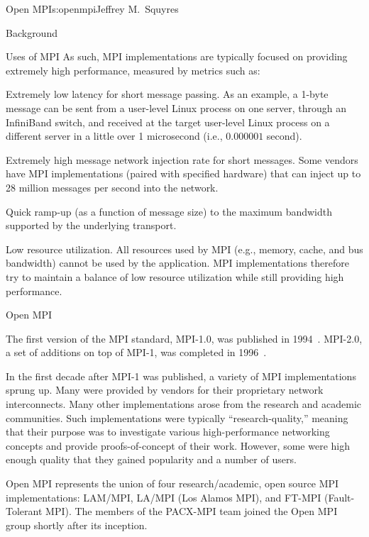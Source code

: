 \begin{aosachapter}{Open MPI}{s:openmpi}{Jeffrey M.\ Squyres}
\begin{aosasect1}{Background}
\begin{aosasect2}{Uses of MPI}
As such, MPI implementations are typically focused on providing
extremely high performance, measured by metrics such as:

\begin{aosaitemize}
\item Extremely low latency for short message passing.  As an example,
  a 1-byte message can be sent from a user-level Linux process on one
  server, through an InfiniBand switch, and received at the target
  user-level Linux process on a different server in a little over 1
  microsecond (i.e., $0.000001$ second).
\item Extremely high message network injection rate for short
  messages.  Some vendors have MPI implementations (paired with
  specified hardware) that can inject up to 28 million messages per
  second into the network.
\item Quick ramp-up (as a function of message size) to the maximum
  bandwidth supported by the underlying transport.
\item Low resource utilization.  All resources used by MPI (e.g.,
  memory, cache, and bus bandwidth) cannot be used by the application.
  MPI implementations therefore try to maintain a balance of low
  resource utilization while still providing high performance.
\end{aosaitemize}

\end{aosasect2}


\begin{aosasect2}{Open MPI}

The first version of the MPI standard, MPI-1.0, was published in
1994~\cite{mpi_forum93:_mpi}.  
%
MPI-2.0, a set of additions on top of MPI-1, was completed in
1996~\cite{geist96:_mpi2_lyon}.

In the first decade after MPI-1 was published, a variety of MPI
implementations sprung up.  Many were provided by vendors for their
proprietary network interconnects.  Many other implementations arose
from the research and academic communities.  Such implementations were
typically ``research-quality,'' meaning that their purpose was to
investigate various high-performance networking concepts and provide
proofs-of-concept of their work.  However, some were high enough
quality that they gained popularity and a number of users.

Open MPI represents the union of four research/academic, open source
MPI implementations: LAM/MPI, LA/MPI (Los Alamos MPI), and FT-MPI
(Fault-Tolerant MPI).
%
The members of the PACX-MPI team joined the Open MPI group shortly
after its inception.


\end{aosasect2}
\end{aosasect1}
\end{aosachapter}
